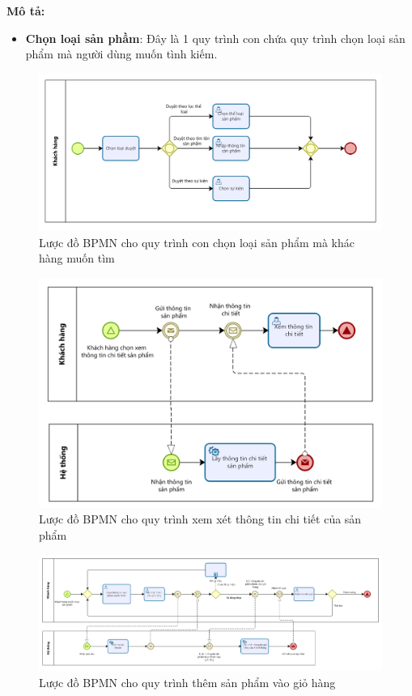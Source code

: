     \textbf{Mô tả:}
    \begin{itemize}
        \item \textbf{Chọn loại sản phầm}: Đây là 1 quy trình con chứa quy trình chọn loại sản phẩm mà người dùng muốn tình kiếm.
    \end{itemize}
    \begin{figure}[!htp]
        \centering
        \includegraphics[width=12cm]{img/BPMN/customer_buy/customer_select_type.png}
        \newline
        \caption{Lược đồ BPMN cho quy trình con chọn loại sản phẩm mà khác hàng muốn tìm}
    \end{figure}
    \begin{figure}[!htp]
        \centering
        \includegraphics[width=12cm]{img/BPMN/customer_buy/customer_product_detail.png}
        \newline
        \caption{Lược đồ BPMN cho quy trình xem xét thông tin chi tiết của sản phẩm}
    \end{figure}
    \begin{figure}[!htp]
        \centering
        \includegraphics[width=15cm]{img/BPMN/customer_buy/customer_add_to_card.png}
        \newline
        \caption{Lược đồ BPMN cho quy trình thêm sản phẩm vào giỏ hàng}
    \end{figure}  
